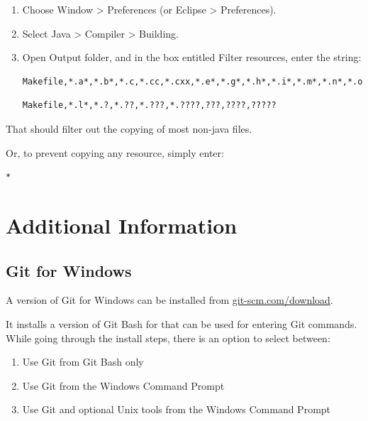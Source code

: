 \begin{enumerate}

\item Choose {\sf Window > Preferences} (or {\sf Eclipse > Preferences}).

\item Select {\sf Java > Compiler > Building}.

\item Open {\sf Output folder}, and in the box entitled {\sf Filter resources},
  enter the string:

\ifWindows
\begin{lstlisting}[]
    Makefile,*.a*,*.b*,*.c,*.cc,*.cxx,*.e*,*.g*,*.h*,*.i*,*.m*,*.n*,*.o*,*.r*,*.s*,*.t*
\end{lstlisting}
\else
\begin{lstlisting}[]
    Makefile,*.l*,*.?,*.??,*.???,*.????,???,????,?????
\end{lstlisting}
\fi

\end{enumerate}

That should filter out the copying of most non-java files.

Or, to prevent copying any resource, simply enter: 
\begin{lstlisting}[]
    *
\end{lstlisting}

\section{Additional Information}

\ifWindows

\subsection{Git for Windows}
\label{GitForWindows}

A version of Git for Windows can be installed from
\href{https://git-scm.com/download}{git-scm.com/download}.

It installs a version of Git Bash for that can be used for entering
Git commands.  While going through the install steps, there is an
option to select between:

\begin{enumerate}

\item Use Git from Git Bash only
\item Use Git from the Windows Command Prompt
\item Use Git and optional Unix tools from the Windows Command Prompt

\end{enumerate}

